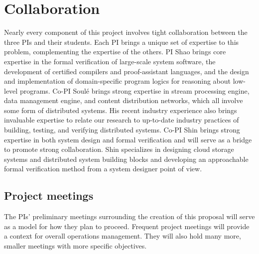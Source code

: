 \documentclass[11pt]{article}
\begin{document}
\section{Collaboration}


Nearly every component of this project involves tight collaboration
between the three PIs and their students. Each PI brings a unique set
of expertise to this problem, complementing the expertise of the
others. PI Shao brings core expertise in the formal verification of
large-scale system software, the development of certified compilers
and proof-assistant languages,  and the design and
implementation of domain-specific program logics for reasoning about
low-level programs. Co-PI Soul\'e brings strong expertise in stream
processing engine, data management engine, and 
content distribution networks, which all involve some form of
distributed systems. His recent industry experience also brings
invaluable expertise to relate our research to up-to-date industry 
practices of building, testing, and verifying distributed systems. 
Co-PI Shin brings strong expertise in both system design and formal
verification and will serve as a bridge to promote strong collaboration.
Shin specializes in designing cloud storage systems and 
distributed system building blocks and developing an approachable
formal verification method from a system designer point of view. 

\subsection{Project meetings}

The PIs' preliminary meetings surrounding the creation of this
proposal will serve as a model for how they plan to proceed. Frequent
project meetings will provide a context for overall operations
management. They will also hold many more, smaller meetings
with more specific objectives.
\end{document}
